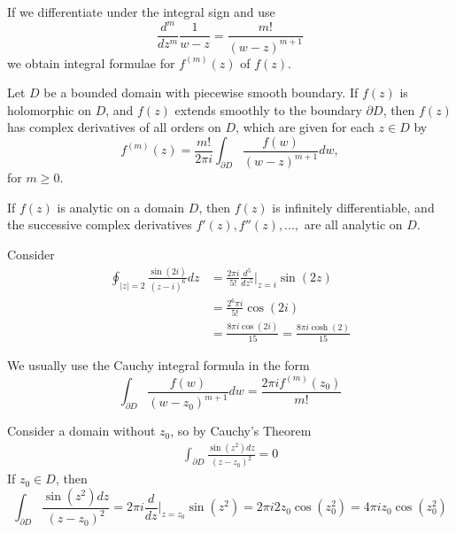 If we differentiate under the integral sign and use \begin{equation*}
    \frac{d^m}{dz^m}\frac{1}{w-z} = \frac{m!}{(w-z)^{m+1}}
\end{equation*}
we obtain integral formulae for $f^{(m)}(z)$ of $f(z)$.

\begin{theorem}
    Let $D$ be a bounded domain with piecewise smooth boundary. If $f(z)$ is holomorphic on $D$, and $f(z)$ extends smoothly to the boundary $\partial D$, then $f(z)$ has complex derivatives of all orders on $D$, which are given for each $z \in D$ by \begin{equation*}
        f^{(m)}(z) = \frac{m!}{2\pi i}\int_{\partial D}\frac{f(w)}{(w-z)^{m+1}}dw,
    \end{equation*}
    for $m \geq 0$.
\end{theorem}

\begin{corollary}
    If $f(z)$ is analytic on a domain $D$, then $f(z)$ is infinitely differentiable, and the successive complex derivatives $f'(z),f''(z),...,$ are all analytic on $D$.
\end{corollary}


\begin{example}
    Consider \begin{align*}
        \oint_{|z| = 2}\frac{\sin(2i)}{(z-i)^6}dz &= \frac{2\pi i}{5!}\frac{d^5}{dz^5}\Bigg\rvert_{z=i}\sin(2z) \\
        &= \frac{2^6\pi i}{5!}\cos(2i) \\
        &= \frac{8\pi i\cos(2i)}{15} = \frac{8\pi i\cosh(2)}{15}
    \end{align*}
\end{example}


We usually use the Cauchy integral formula in the form \begin{equation*}
    \int_{\partial D}\frac{f(w)}{(w-z_0)^{m+1}}dw = \frac{2\pi if^{(m)}(z_0)}{m!}
\end{equation*}

\begin{example}
    Consider a domain without $z_0$, so by Cauchy's Theorem \begin{align*}
        \int_{\partial D}\frac{\sin(z^2)dz}{(z-z_0)^2} = 0 
    \end{align*}
    If $z_0 \in D$, then \begin{equation*}
        \int_{\partial D}\frac{\sin(z^2)dz}{(z-z_0)^2} = 2\pi i\frac{d}{dz}\Bigg\rvert_{z=z_0}\sin(z^2) = 2\pi i2z_0\cos(z_0^2) = 4\pi iz_0\cos(z_0^2)
    \end{equation*}
\end{example}


